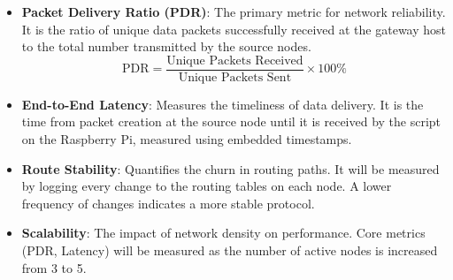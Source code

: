 \begin{itemize}
\item \textbf{Packet Delivery Ratio (PDR)}: The primary metric for network reliability. It is the ratio of unique data packets successfully received at the gateway host to the total number transmitted by the source nodes.
\begin{equation}
\text{PDR} = \frac{\text{Unique Packets Received}}{\text{Unique Packets Sent}} \times 100\%
\end{equation}

\item \textbf{End-to-End Latency}: Measures the timeliness of data delivery. It is the time from packet creation at the source node until it is received by the script on the Raspberry Pi, measured using embedded timestamps.

\item \textbf{Route Stability}: Quantifies the churn in routing paths. It will be measured by logging every change to the routing tables on each node. A lower frequency of changes indicates a more stable protocol.

\item \textbf{Scalability}: The impact of network density on performance. Core metrics (PDR, Latency) will be measured as the number of active nodes is increased from 3 to 5.
\end{itemize}

